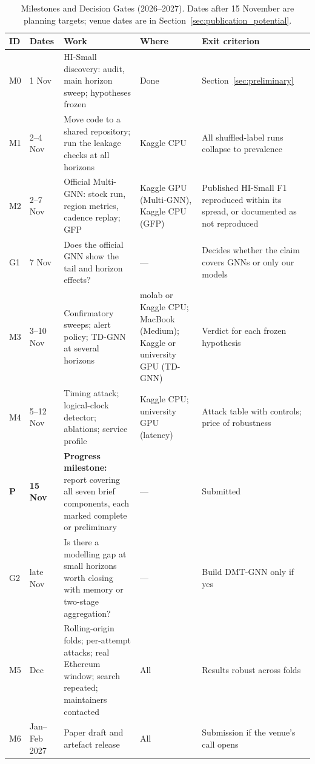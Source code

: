 \documentclass[11pt,a4paper]{article}
\begin{document}
\begin{table}[htbp]
\centering
\scriptsize
\caption{Milestones and Decision Gates (2026--2027). Dates after 15 November are planning targets; venue dates are in Section~\ref{sec:publication_potential}.}
\label{tab:phase3_plan}
\begin{tabularx}{\textwidth}{L{0.8cm} L{1.5cm} X L{2.3cm} L{3.2cm}}
\toprule
\textbf{ID} & \textbf{Dates} & \textbf{Work} & \textbf{Where} & \textbf{Exit criterion} \\
\midrule
M0 & 1 Nov & HI-Small discovery: audit, main horizon sweep; hypotheses frozen & Done & Section~\ref{sec:preliminary} \\
\midrule
M1 & 2--4 Nov & Move code to a shared repository; run the leakage checks at all horizons & Kaggle CPU & All shuffled-label runs collapse to prevalence \\
\midrule
M2 & 2--7 Nov & Official Multi-GNN: stock run, region metrics, cadence replay; GFP & Kaggle GPU (Multi-GNN), Kaggle CPU (GFP) & Published HI-Small F1 reproduced within its spread, or documented as not reproduced \\
\midrule
G1 & 7 Nov & Does the official GNN show the tail and horizon effects? & --- & Decides whether the claim covers GNNs or only our models \\
\midrule
M3 & 3--10 Nov & Confirmatory sweeps; alert policy; TD-GNN at several horizons & molab or Kaggle CPU; MacBook (Medium); Kaggle or university GPU (TD-GNN) & Verdict for each frozen hypothesis \\
\midrule
M4 & 5--12 Nov & Timing attack; logical-clock detector; ablations; service profile & Kaggle CPU; university GPU (latency) & Attack table with controls; price of robustness \\
\midrule
\textbf{P} & \textbf{15 Nov} & \textbf{Progress milestone:} report covering all seven brief components, each marked complete or preliminary & --- & Submitted \\
\midrule
G2 & late Nov & Is there a modelling gap at small horizons worth closing with memory or two-stage aggregation? & --- & Build DMT-GNN only if yes \\
\midrule
M5 & Dec & Rolling-origin folds; per-attempt attacks; real Ethereum window; search repeated; maintainers contacted & All & Results robust across folds \\
\midrule
M6 & Jan--Feb 2027 & Paper draft and artefact release & All & Submission if the venue's call opens \\
\bottomrule
\end{tabularx}
\end{table}
\end{document}
